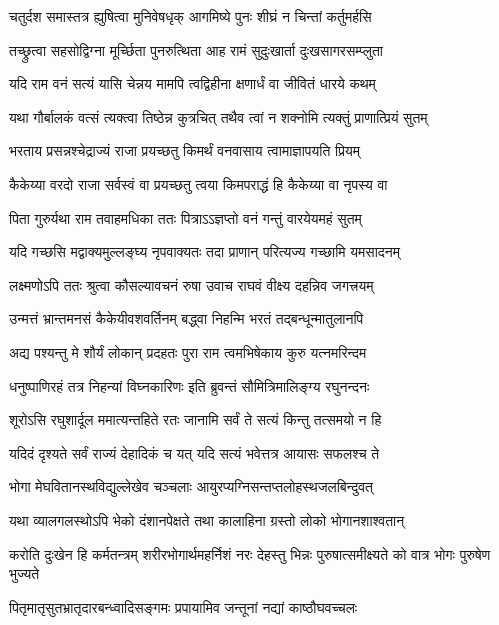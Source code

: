 \twolineshloka
{चतुर्दश समास्तत्र ह्युषित्वा मुनिवेषधृक्}
{आगमिष्ये पुनः शीघ्रं न चिन्तां कर्तुमर्हसि} %

\twolineshloka
{तच्छ्रुत्वा सहसोद्विग्ना मूर्च्छिता पुनरुत्थिता}
{आह रामं सुदुःखार्ता दुःखसागरसम्प्लुता} %

\twolineshloka
{यदि राम वनं सत्यं यासि चेन्नय मामपि}
{त्वद्विहीना क्षणार्धं वा जीवितं धारये कथम्} %

\twolineshloka
{यथा गौर्बालकं वत्सं त्यक्त्वा तिष्ठेन्न कुत्रचित्}
{तथैव त्वां न शक्नोमि त्यक्तुं प्राणात्प्रियं सुतम्} %

\twolineshloka
{भरताय प्रसन्नश्चेद्राज्यं राजा प्रयच्छतु}
{किमर्थं वनवासाय त्वामाज्ञापयति प्रियम्} %

\twolineshloka
{कैकेय्या वरदो राजा सर्वस्वं वा प्रयच्छतु}
{त्वया किमपराद्धं हि कैकेय्या वा नृपस्य वा} %

\twolineshloka
{पिता गुरुर्यथा राम तवाहमधिका ततः}
{पित्राऽऽज्ञप्तो वनं गन्तुं वारयेयमहं सुतम्} %

\twolineshloka
{यदि गच्छसि मद्वाक्यमुल्लङ्घ्य नृपवाक्यतः}
{तदा प्राणान् परित्यज्य गच्छामि यमसादनम्} %

\twolineshloka
{लक्ष्मणोऽपि ततः श्रुत्वा कौसल्यावचनं रुषा}
{उवाच राघवं वीक्ष्य दहन्निव जगत्त्रयम्} %

\twolineshloka
{उन्मत्तं भ्रान्तमनसं कैकेयीवशवर्तिनम्}
{बद्ध्वा निहन्मि भरतं तद्बन्धून्मातुलानपि} %

\twolineshloka
{अद्य पश्यन्तु मे शौर्यं लोकान् प्रदहतः पुरा}
{राम त्वमभिषेकाय कुरु यत्नमरिन्दम} %

\twolineshloka
{धनुष्पाणिरहं तत्र निहन्यां विघ्नकारिणः}
{इति ब्रुवन्तं सौमित्रिमालिङ्ग्य रघुनन्दनः} %

\twolineshloka
{शूरोऽसि रघुशार्दूल ममात्यन्तहिते रतः}
{जानामि सर्वं ते सत्यं किन्तु तत्समयो न हि} %

\twolineshloka
{यदिदं दृश्यते सर्वं राज्यं देहादिकं च यत्}
{यदि सत्यं भवेत्तत्र आयासः सफलश्च ते} %

\twolineshloka
{भोगा मेघवितानस्थविद्युल्लेखेव चञ्चलाः}
{आयुरप्यग्निसन्तप्तलोहस्थजलबिन्दुवत्} %

\twolineshloka
{यथा व्यालगलस्थोऽपि भेको दंशानपेक्षते}
{तथा कालाहिना ग्रस्तो लोको भोगानशाश्वतान्} %

\fourlineindentedshloka
{करोति दुःखेन हि कर्मतन्त्रम्}
{शरीरभोगार्थमहर्निशं नरः}
{देहस्तु भिन्नः पुरुषात्समीक्ष्यते}
{को वात्र भोगः पुरुषेण भुज्यते} %

\twolineshloka
{पितृमातृसुतभ्रातृदारबन्ध्वादिसङ्गमः}
{प्रपायामिव जन्तूनां नद्यां काष्ठौघवच्चलः} %

